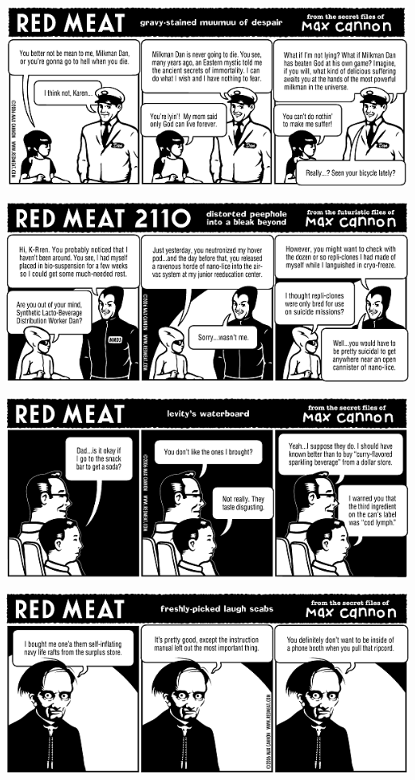 \documentclass[a4paper,twoside,11pt]{article}
\begin{document}
\includegraphics[width=\textwidth]{redmeat_2006-05-09.png}



\includegraphics[width=\textwidth]{redmeat_2006-05-16.png}



\includegraphics[width=\textwidth]{redmeat_2006-05-23.png}



\includegraphics[width=\textwidth]{redmeat_2006-05-30.png}
\end{document}
